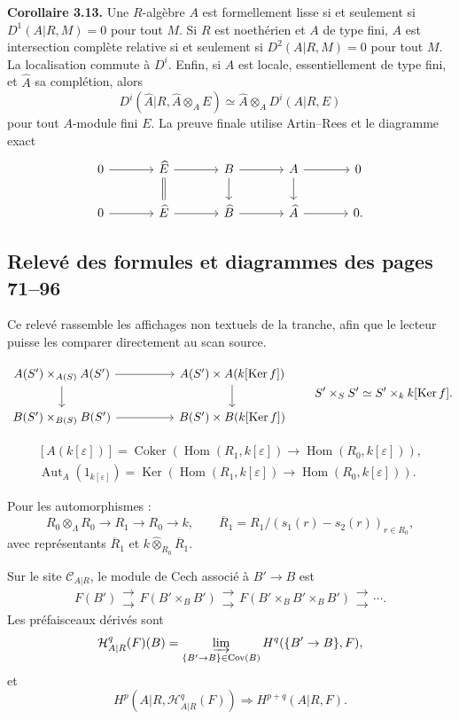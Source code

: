 \documentclass[11pt]{article}
\providecommand{\Aut}{\operatorname{Aut}}
\providecommand{\Ker}{\operatorname{Ker}}
\providecommand{\Hom}{\operatorname{Hom}}
\providecommand{\Coker}{\operatorname{Coker}}
\providecommand{\Cov}{\operatorname{Cov}}
\providecommand{\cC}{\mathcal C}
\providecommand{\cH}{\mathcal H}
\providecommand{\Ahat}{\widehat A}
\providecommand{\Bhat}{\widehat B}
\providecommand{\Ehat}{\widehat E}
\begin{document}
\textbf{Corollaire 3.13.}  Une \(R\)-algèbre \(A\) est formellement lisse si et seulement si \(D^1(A|R,M)=0\) pour tout \(M\).  Si \(R\) est noethérien et \(A\) de type fini, \(A\) est intersection complète relative si et seulement si \(D^2(A|R,M)=0\) pour tout \(M\).  La localisation commute à \(D^i\).  Enfin, si \(A\) est locale, essentiellement de type fini, et \(\Ahat\) sa complétion, alors
\[
D^i(\Ahat|R,\Ahat\otimes_AE)\simeq \Ahat\otimes_A D^i(A|R,E)
\]
pour tout \(A\)-module fini \(E\).  La preuve finale utilise Artin--Rees et le diagramme exact
\[
\begin{tikzcd}[column sep=large]
0\arrow[r]&\Ehat\arrow[r]\arrow[d,equal]&B\arrow[r]\arrow[d]&A\arrow[r]\arrow[d]&0\\
0\arrow[r]&\Ehat\arrow[r]&\Bhat\arrow[r]&\Ahat\arrow[r]&0.
\end{tikzcd}
\]


\subsection*{Relevé des formules et diagrammes des pages 71--96}

Ce relevé rassemble les affichages non textuels de la tranche, afin que le lecteur puisse les comparer directement au scan source.

\[
\begin{tikzcd}[column sep=huge]
A(S')\times_{A(S)}A(S') \arrow[r] \arrow[d] & A(S')\times A(k[\Ker f]) \arrow[d] \\
B(S')\times_{B(S)}B(S') \arrow[r] & B(S')\times B(k[\Ker f])
\end{tikzcd}
\qquad
S'\times_SS'\simeq S'\times_k k[\Ker f].
\]

\[
\begin{gathered}
[A(k[\varepsilon])] = \Coker(\Hom(R_1,k[\varepsilon])\to\Hom(R_0,k[\varepsilon])),\\
\Aut_A(1_{k[\varepsilon]})=
\Ker(\Hom(R_1,k[\varepsilon])\to\Hom(R_0,k[\varepsilon])).
\end{gathered}
\]

Pour les automorphismes :
\[
R_0\otimes_\Lambda R_0\to R_1\to R_0\to k,
\qquad
\overline R_1=R_1/(s_1(r)-s_2(r))_{r\in R_0},
\]
avec représentants \(\overline R_1\) et \(k\widehat\otimes_{R_0}\overline R_1\).

Sur le site \(\cC_{A|R}\), le module de Cech associé à \(B'\to B\) est
\[
F(B')\mathrel{\substack{\longrightarrow\\[-.6ex]\longrightarrow}} F(B'\times_BB')\mathrel{\substack{\longrightarrow\\[-.6ex]\longrightarrow}}
F(B'\times_BB'\times_BB')\mathrel{\substack{\longrightarrow\\[-.6ex]\longrightarrow}}\cdots .
\]
Les préfaisceaux dérivés sont
\[
\cH^q_{A|R}(F)(B)=\varinjlim_{\{B'\to B\}\in \Cov(B)}H^q(\{B'\to B\},F),
\]
et
\[
H^p(A|R,\cH^q_{A|R}(F))\Rightarrow H^{p+q}(A|R,F).
\]
\end{document}
